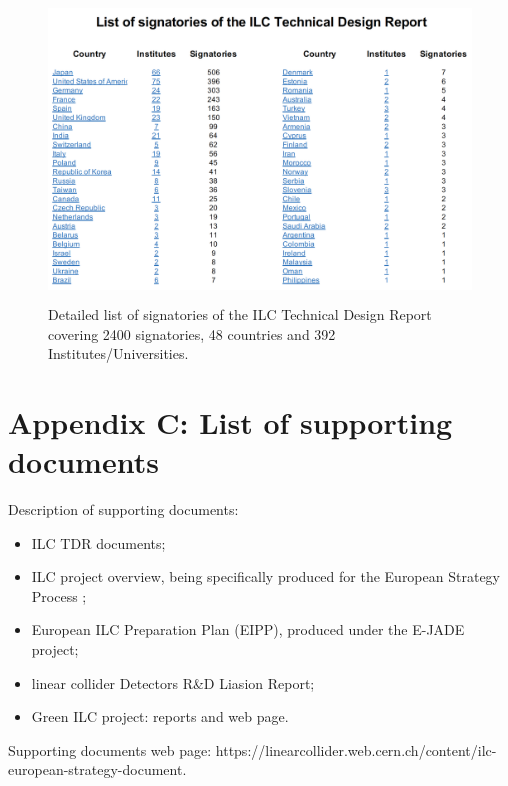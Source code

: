 \documentclass[%
 reprint,
 amsmath,amssymb,
 aps,
]{revtex4-1}
\begin{document}
 \begin{figure}[h]
 \begin{center}
 \includegraphics[width=\hsize,height=8cm]{figures/CountriesInstitutes.png}
\caption{Detailed list of signatories of the ILC Technical Design Report covering 2400 signatories, 48 countries and 392 Institutes/Universities. \label{TDRsignatories}}
 \end{center}
 \end{figure}

\newpage

\section*{\label{Appendix3} \Large{Appendix C: List of supporting documents} }
Description of supporting documents:
\begin{itemize}
\item
ILC TDR documents;
\item
ILC project overview, being specifically produced for the European Strategy Process \cite{ILCforESS};
\item
European ILC Preparation Plan (EIPP), produced under the E-JADE project;
\item
linear collider Detectors R\&D Liasion Report;
\item
Green ILC project: reports and web page.

\end{itemize}

Supporting documents web page: https://linearcollider.web.cern.ch/content/ilc-european-strategy-document.
\end{document}
